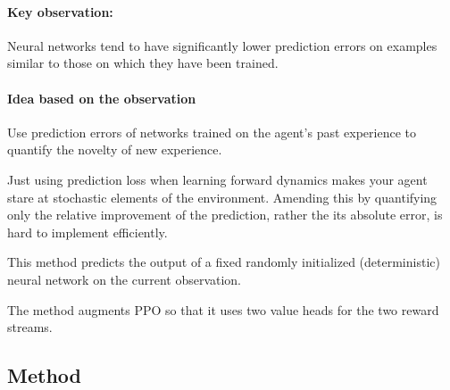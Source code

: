 \documentclass{article}
\begin{document}
\paragraph{Key observation:}
Neural networks tend to have significantly lower prediction errors on examples similar
to those on which they have been trained.
\paragraph{Idea based on the observation}
Use prediction errors of networks trained on the agent's past experience to quantify the novelty of new experience.

Just using prediction loss when learning forward dynamics makes your agent stare at stochastic elements of the environment.
Amending this by quantifying only the relative improvement of the prediction, rather the its absolute error,
is hard to implement efficiently.

This method predicts the output of a fixed randomly initialized (deterministic) neural network on the current observation.

The method augments PPO so that it uses two value heads for the two reward streams.

\subsection{Method}
\end{document}
